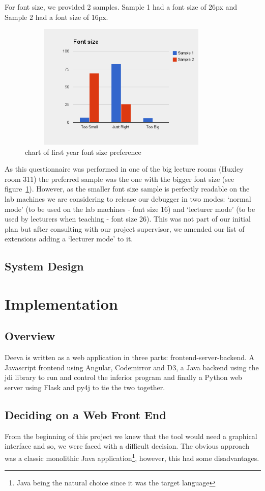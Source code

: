 \documentclass[11pt, a4paper]{article}
\begin{document}
For font size, we provided 2 samples.
Sample 1 had a font size of 26px and Sample 2 had a font size of 16px.
\begin{figure}[h!]
\centering
\includegraphics[height=60mm,width=100mm]{fonts.png}
\caption{chart of first year font size preference}
\label{fig:label}
\end{figure}
As this questionnaire was performed in one of the big lecture rooms (Huxley room 311) the preferred sample was the one with the bigger font size (see figure~\ref{fig:label}).
However, as the smaller font size sample is perfectly readable on the lab machines we are considering to release our debugger in two modes: `normal mode' (to be used on the lab machines - font size 16) and  `lecturer mode' (to be used by lecturers when teaching - font size 26).
This was not part of our initial plan but after consulting with our project supervisor, we amended our list of extensions adding a `lecturer mode' to it.

\subsection{System Design}
\section{Implementation}

\subsection{Overview}
Deeva is written as a web application in three parts: frontend-server-backend.
A Javascript frontend using Angular, Codemirror and D3, a Java backend using the jdi library to run and control the inferior program and finally a Python web server using Flask and py4j to tie the two together.

\subsection{Deciding on a Web Front End}
From the beginning of this project we knew that the tool would need a graphical interface and so, we were faced with a difficult decision.
The obvious approach was a classic monolithic Java application\footnote{Java being the natural choice since it was the target language}, however, this had some disadvantages. 
\end{document}

